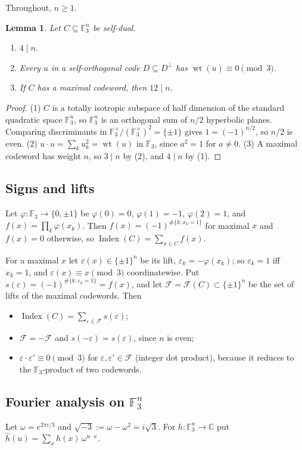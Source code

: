 \documentclass[11pt]{amsart}
\newtheorem{lemma}[theorem]{Lemma}
\theoremstyle{definition}
\newcommand{\F}{\mathbb{F}_3}
\newcommand{\wt}{\operatorname{wt}}
\newcommand{\Index}{\operatorname{Index}}
\newcommand{\cF}{\mathcal{F}}
\newcommand{\isq}{\sqrt{-3}}
\begin{document}
Throughout, $n\ge1$.

\begin{lemma}\label{lem:basic}
Let $C\subseteq\F^n$ be self-dual.
\begin{enumerate}
\item $4\mid n$.
\item Every $u$ in a self-orthogonal code $D\subseteq D^\perp$ has $\wt(u)\equiv0\pmod3$.
\item If $C$ has a maximal codeword, then $12\mid n$.
\end{enumerate}
\end{lemma}

\begin{proof}
(1) $C$ is a totally isotropic subspace of half dimension of the standard quadratic space $\F^n$,
so $\F^n$ is an orthogonal sum of $n/2$ hyperbolic planes. Comparing discriminants in
$\F^\times/(\F^\times)^2=\{\pm1\}$ gives $1=(-1)^{n/2}$, so $n/2$ is even.
(2) $u\cdot u=\sum_ku_k^2=\wt(u)$ in $\F$, since $a^2=1$ for $a\ne0$.
(3) A maximal codeword has weight $n$, so $3\mid n$ by (2), and $4\mid n$ by (1).
\end{proof}

\subsection*{Signs and lifts}
Let $\varphi\colon\F\to\{0,\pm1\}$ be $\varphi(0)=0$, $\varphi(1)=-1$, $\varphi(2)=1$, and
$f(x)=\prod_k\varphi(x_k)$. Then $f(x)=(-1)^{\#\{k:x_k=1\}}$ for maximal $x$ and $f(x)=0$ otherwise,
so $\Index(C)=\sum_{x\in C}f(x)$.

For a maximal $x$ let $\varepsilon(x)\in\{\pm1\}^n$ be its lift, $\varepsilon_k=-\varphi(x_k)$; so
$\varepsilon_k=1$ iff $x_k=1$, and $\varepsilon(x)\equiv x\pmod 3$ coordinatewise. Put
$s(\varepsilon)=(-1)^{\#\{k:\varepsilon_k=1\}}=f(x)$, and let $\cF=\cF(C)\subset\{\pm1\}^n$ be the
set of lifts of the maximal codewords. Then
\begin{itemize}
\item $\Index(C)=\sum_{\varepsilon\in\cF}s(\varepsilon)$;
\item $\cF=-\cF$ and $s(-\varepsilon)=s(\varepsilon)$, since $n$ is even;
\item $\varepsilon\cdot\varepsilon'\equiv0\pmod3$ for $\varepsilon,\varepsilon'\in\cF$ (integer dot
product), because it reduces to the $\F$-product of two codewords.
\end{itemize}

\subsection*{Fourier analysis on \texorpdfstring{$\F^n$}{F\_3\textasciicircum n}}
Let $\omega=e^{2\pi i/3}$ and $\isq:=\omega-\omega^2=i\sqrt3$. For $h\colon\F^n\to\mathbb C$ put
$\hat h(u)=\sum_xh(x)\,\omega^{u\cdot x}$.
\end{document}
